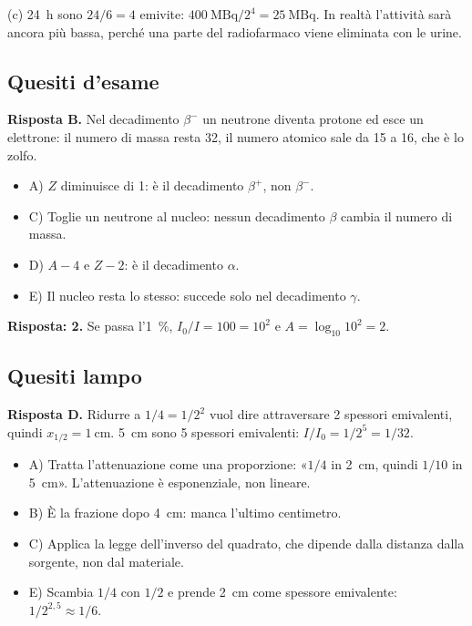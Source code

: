 (c) \SI{24}{\hour} sono $24/6 = 4$ emivite: $\SI{400}{\mega\becquerel} / 2^4 = \SI{25}{\mega\becquerel}$. In realtà l'attività sarà ancora più bassa, perché una parte del radiofarmaco viene eliminata con le urine.


\subsection*{Quesiti d'esame}

\textbf{Risposta B.} Nel decadimento $\beta^-$ un neutrone diventa protone ed esce un elettrone: il numero di massa resta 32, il numero atomico sale da 15 a 16, che è lo zolfo.
\begin{itemize}
  \item A) $Z$ diminuisce di 1: è il decadimento $\beta^+$, non $\beta^-$.
  \item C) Toglie un neutrone al nucleo: nessun decadimento $\beta$ cambia il numero di massa.
  \item D) $A - 4$ e $Z - 2$: è il decadimento $\alpha$.
  \item E) Il nucleo resta lo stesso: succede solo nel decadimento $\gamma$.
\end{itemize}

\textbf{Risposta: 2.} Se passa l'\SI{1}{\percent}, $I_0/I = 100 = 10^2$ e $A = \log_{10} 10^2 = 2$.

\subsection*{Quesiti lampo}

\textbf{Risposta D.} Ridurre a $1/4 = 1/2^2$ vuol dire attraversare 2 spessori emivalenti, quindi $x_{1/2} = \SI{1}{\centi\metre}$. \SI{5}{\centi\metre} sono 5 spessori emivalenti: $I/I_0 = 1/2^5 = 1/32$.
\begin{itemize}
  \item A) Tratta l'attenuazione come una proporzione: «$1/4$ in \SI{2}{\centi\metre}, quindi $1/10$ in \SI{5}{\centi\metre}». L'attenuazione è esponenziale, non lineare.
  \item B) È la frazione dopo \SI{4}{\centi\metre}: manca l'ultimo centimetro.
  \item C) Applica la legge dell'inverso del quadrato, che dipende dalla distanza dalla sorgente, non dal materiale.
  \item E) Scambia $1/4$ con $1/2$ e prende \SI{2}{\centi\metre} come spessore emivalente: $1/2^{2,5} \approx 1/6$.
\end{itemize}
